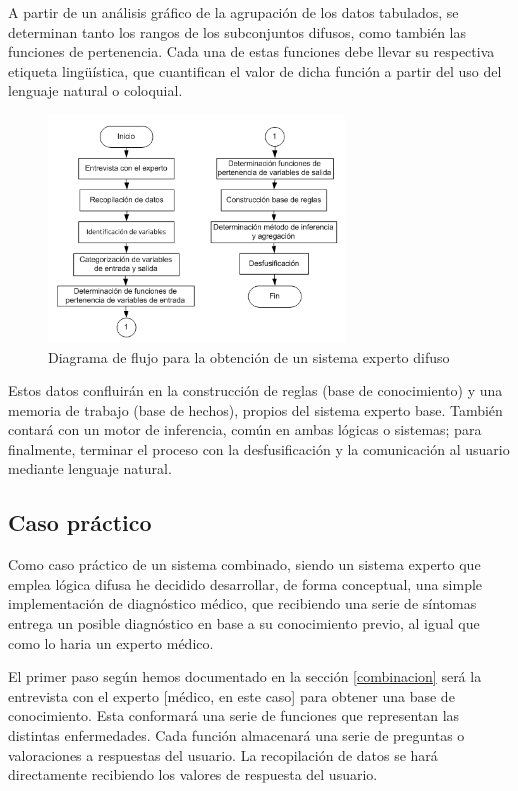 \documentclass[a4paper, 11pt, titlepage]{article}
\begin{document}
    A partir de un análisis gráfico de la agrupación de los datos tabulados, se determinan tanto los 
    rangos de los subconjuntos difusos, como también las funciones de pertenencia. Cada una de 
    estas funciones debe llevar su respectiva etiqueta lingüística, que cuantifican el valor de dicha 
    función a partir del uso del lenguaje natural o coloquial. 

    \begin{figure}[htp]
        \centering
        \includegraphics[width=0.7\textwidth]{resources/diagramaflujoexperto.png}
        \caption{Diagrama de flujo para la obtención de un sistema experto difuso}
        \label{diagramaflujoexperto}
    \end{figure}

    Estos datos confluirán en la construcción de reglas (base de conocimiento) y una memoria de trabajo 
    (base de hechos), propios del sistema experto base. También contará con un motor de inferencia, común 
    en ambas lógicas o sistemas; para finalmente, terminar el proceso con la desfusificación y la comunicación 
    al usuario mediante lenguaje natural.
    
    \subsection{Caso práctico}\label{casopractico}

        Como caso práctico de un sistema combinado, siendo un sistema experto que emplea lógica difusa he 
        decidido desarrollar, de forma conceptual, una simple implementación de diagnóstico médico, que 
        recibiendo una serie de síntomas entrega un posible diagnóstico en base a su conocimiento previo, al igual 
        que como lo haria un experto médico.

        El primer paso según hemos documentado en la sección \ref{combinacion} será la entrevista con el 
        experto [médico, en este caso] para obtener una base de conocimiento. Esta conformará una serie de 
        funciones que representan las distintas enfermedades. Cada función almacenará una serie de preguntas 
        o valoraciones a respuestas del usuario. La recopilación de datos se hará directamente recibiendo los 
        valores de respuesta del usuario.
\end{document}
